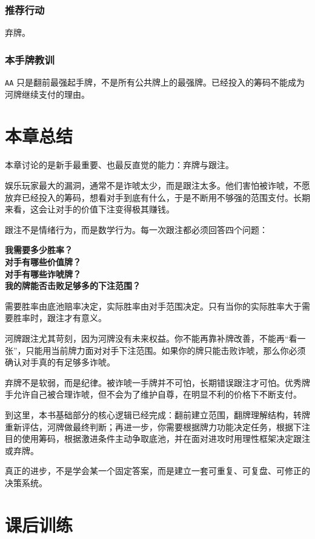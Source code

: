 \subsubsection*{推荐行动}

弃牌。

\subsubsection*{本手牌教训}

\texttt{AA} 只是翻前最强起手牌，不是所有公共牌上的最强牌。已经投入的筹码不能成为河牌继续支付的理由。

\section{本章总结}

本章讨论的是新手最重要、也最反直觉的能力：弃牌与跟注。

娱乐玩家最大的漏洞，通常不是诈唬太少，而是跟注太多。他们害怕被诈唬，不愿放弃已经投入的筹码，想看对手到底有什么，于是不断用不够强的范围支付。长期来看，这会让对手的价值下注变得极其赚钱。

跟注不是情绪行为，而是数学行为。每一次跟注都必须回答四个问题：

\begin{center}
\textbf{我需要多少胜率？\\
对手有哪些价值牌？\\
对手有哪些诈唬牌？\\
我的牌能否击败足够多的下注范围？}
\end{center}

需要胜率由底池赔率决定，实际胜率由对手范围决定。只有当你的实际胜率大于需要胜率时，跟注才有意义。

河牌跟注尤其苛刻，因为河牌没有未来权益。你不能再靠补牌改善，不能再“看一张”，只能用当前牌力面对对手下注范围。如果你的牌只能击败诈唬，那么你必须确认对手真的有足够多诈唬。

弃牌不是软弱，而是纪律。被诈唬一手牌并不可怕，长期错误跟注才可怕。优秀牌手允许自己被合理诈唬，但不会为了维护自尊，在明显不利的价格下不断支付。

到这里，本书基础部分的核心逻辑已经完成：翻前建立范围，翻牌理解结构，转牌重新评估，河牌做最终判断；再进一步，你需要根据牌力功能决定任务，根据下注目的使用筹码，根据激进条件主动争取底池，并在面对进攻时用理性框架决定跟注或弃牌。

真正的进步，不是学会某一个固定答案，而是建立一套可重复、可复盘、可修正的决策系统。

\section{课后训练}


